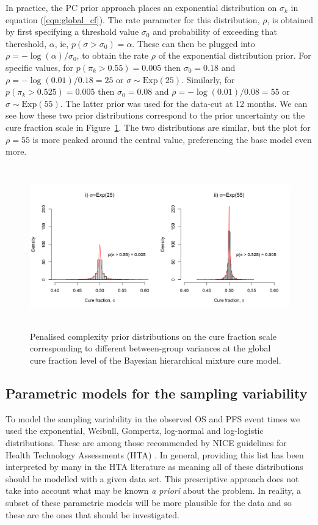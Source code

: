 \documentclass[AMA,STIX1COL]{WileyNJD-v2}
\begin{document}
In practice, the PC prior approach places an exponential distribution on $\sigma_k$ in equation (\ref{eqn:global_cf}).
The rate parameter for this distribution, $\rho$, is obtained by first specifying a threshold value $\sigma_0$ and probability of exceeding that thereshold, $\alpha$, ie, $p(\sigma > \sigma_0) = \alpha$. These can then be plugged into $\rho = - \log(\alpha)/\sigma_0$, to obtain the rate $\rho$ of the exponential distribution prior.
For specific values, for $p(\pi_k > 0.55) = 0.005$ then $\sigma_0 = 0.18$ and $\rho = - \log(0.01)/0.18 = 25$ or $\sigma \sim \mbox{Exp}(25)$.
Similarly, for $p(\pi_k > 0.525) = 0.005$ then $\sigma_0 = 0.08$ and $\rho = - \log(0.01)/0.08 = 55$ or $\sigma \sim \mbox{Exp}(55)$.
The latter prior was used for the data-cut at 12 months. We can see how these two prior distributions correspond to the prior uncertainty on the cure fraction scale in Figure~\ref{fig:complexityprior}. The two distributions are similar, but the plot for $\rho = 55$ is more peaked around the central value, preferencing the base model even more.

\begin{figure}[!ht]
\centering
\includegraphics[height=7cm, width=0.9\linewidth]{complexity-prior-plot.png}
\caption{\label{fig:complexityprior} Penalised complexity prior distributions on the cure fraction scale corresponding to different between-group variances at the global cure fraction level of the Bayesian hierarchical mixture cure model.}
\end{figure}

%
\subsection{Parametric models for the sampling variability}
To model the sampling variability in the observed OS and PFS event times we used the exponential, Weibull, Gompertz, log-normal and log-logistic distributions. These are among those recommended by NICE guidelines for Health Technology Assessments (HTA) \cite{Latimer2011}.
In general, providing this list has been interpreted by many in the HTA literature as meaning all of these distributions should be modelled with a given data set.
This prescriptive approach does not take into account what may be known {\it a priori} about the problem.
In reality, a subset of these parametric models will be more plausible for the data and so these are the ones that should be investigated.
\end{document}

